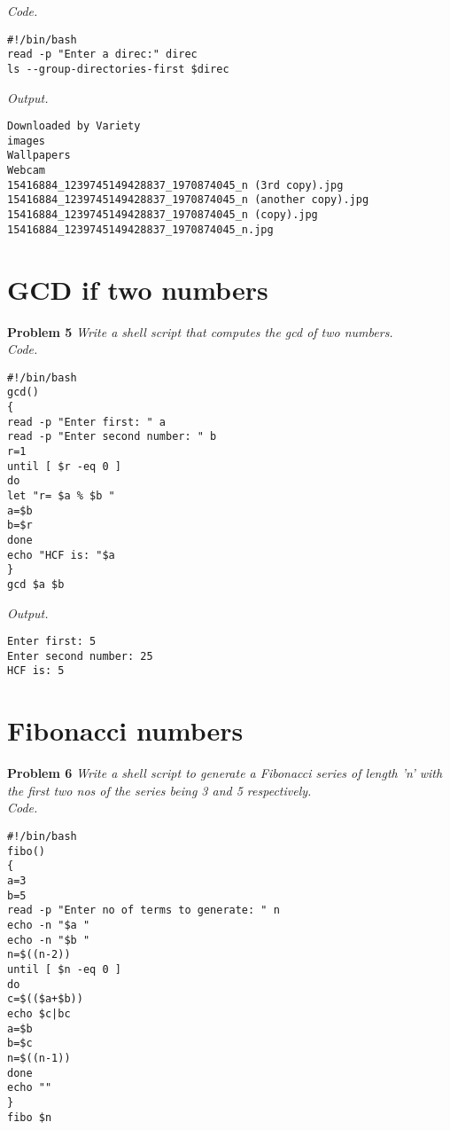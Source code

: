 \documentclass[12pt]{article}
\begin{document}
\textit{Code.}

\begin{lstlisting}
#!/bin/bash
read -p "Enter a direc:" direc
ls --group-directories-first $direc
\end{lstlisting}

\textit{Output.}
\begin{lstlisting}
Downloaded by Variety
images
Wallpapers
Webcam
15416884_1239745149428837_1970874045_n (3rd copy).jpg
15416884_1239745149428837_1970874045_n (another copy).jpg
15416884_1239745149428837_1970874045_n (copy).jpg
15416884_1239745149428837_1970874045_n.jpg
\end{lstlisting}

\section{GCD if two numbers}

\textbf{Problem 5} \textit{Write a shell script that computes the gcd of two numbers.}\\

\textit{Code.}

\begin{lstlisting}
#!/bin/bash
gcd()
{
read -p "Enter first: " a
read -p "Enter second number: " b
r=1
until [ $r -eq 0 ]
do
let "r= $a % $b "
a=$b
b=$r
done
echo "HCF is: "$a
}
gcd $a $b
\end{lstlisting}

\textit{Output.}
\begin{lstlisting}
Enter first: 5
Enter second number: 25
HCF is: 5
\end{lstlisting}

\section{Fibonacci numbers}

\textbf{Problem 6} \textit{Write a shell script to generate a Fibonacci series of length 'n' with the first two nos of the series being
	3 and 5 respectively.}\\

\textit{Code.}

\begin{lstlisting}
#!/bin/bash
fibo()
{
a=3
b=5
read -p "Enter no of terms to generate: " n
echo -n "$a "
echo -n "$b "
n=$((n-2))
until [ $n -eq 0 ]
do
c=$(($a+$b))
echo $c|bc
a=$b
b=$c
n=$((n-1))
done
echo ""
}
fibo $n
\end{lstlisting}
\end{document}
